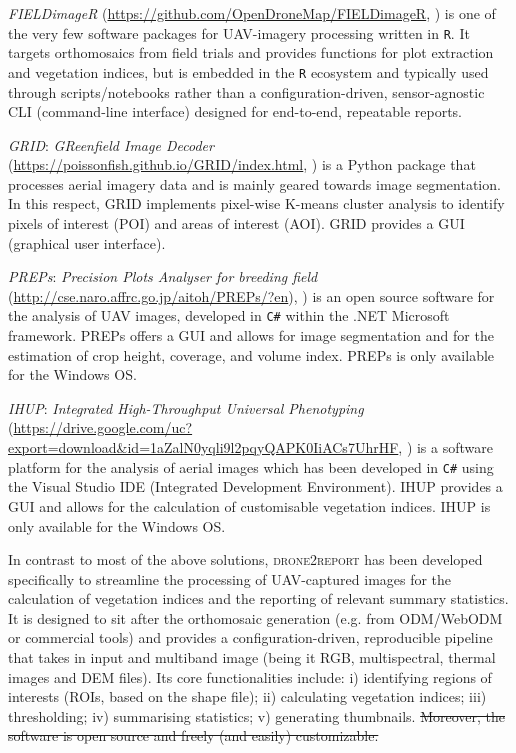 \documentclass[drones,technicalnote,accept,pdftex,moreauthors]{Definitions/mdpi}
\providecommand{\DIFdel}[1]{{\protect\color{red}\sout{#1}}}                      %
\providecommand{\DIFdelbegin}{} %
\providecommand{\DIFdelend}{} %
\newcommand{\DIFscaledelfig}{0.5}
\newlength{\DIFdelgraphicswidth} %
\newlength{\DIFdelgraphicsheight} %
\newcommand{\DIFdelincludegraphics}[2][]{%
\sbox{\DIFdelgraphicsbox}{\DIFOincludegraphics[#1]{#2}}%
\settoboxwidth{\DIFdelgraphicswidth}{\DIFdelgraphicsbox} %
\settoboxtotalheight{\DIFdelgraphicsheight}{\DIFdelgraphicsbox} %
\scalebox{\DIFscaledelfig}{%
\parbox[b]{\DIFdelgraphicswidth}{\usebox{\DIFdelgraphicsbox}\\[-\baselineskip] \rule{\DIFdelgraphicswidth}{0em}}\llap{\resizebox{\DIFdelgraphicswidth}{\DIFdelgraphicsheight}{%
\setlength{\unitlength}{\DIFdelgraphicswidth}%
\begin{picture}(1,1)%
\thicklines\linethickness{2pt} %
{\color[rgb]{1,0,0}\put(0,0){\framebox(1,1){}}}%
{\color[rgb]{1,0,0}\put(0,0){\line( 1,1){1}}}%
{\color[rgb]{1,0,0}\put(0,1){\line(1,-1){1}}}%
\end{picture}%
}\hspace*{3pt}}} %
} %
\DeclareRobustCommand{\DIFdelbegin}{\DIFOdelbegin \let\includegraphics\DIFdelincludegraphics} %
\DeclareRobustCommand{\DIFdelend}{\DIFOaddend \let\includegraphics\DIFOincludegraphics} %
\begin{document}
\textit{FIELDimageR} (\url{https://github.com/OpenDroneMap/FIELDimageR}, \cite{matias_fieldimager_2020}) is one of the very few software packages for UAV-imagery processing written in \texttt{R}. It targets orthomosaics from field trials and provides functions for plot extraction and vegetation indices, but is embedded in the \texttt{R} ecosystem and typically used through scripts/notebooks rather than a configuration-driven, sensor-agnostic CLI (command-line interface) designed for end-to-end, repeatable reports.

\textit{GRID}: \textit{GReenfield Image Decoder} (\url{https://poissonfish.github.io/GRID/index.html},
\cite{ChenZhang2020}) is a Python package that processes aerial imagery data and is mainly geared towards image segmentation. In this respect, GRID implements pixel-wise K-means cluster analysis to identify pixels of interest (POI) and areas of interest (AOI). GRID provides a GUI (graphical user interface).

\textit{PREPs}: \textit{Precision Plots Analyser for breeding field} (\url{http://cse.naro.affrc.go.jp/aitoh/PREPs/?en}), \cite{itoh2024preps}) is an open source software for the analysis of UAV images, developed in \verb|C#| within the .NET Microsoft framework. PREPs offers a GUI and allows for image segmentation and for the estimation of crop height, coverage, and volume index. PREPs is only available for the Windows OS.

\textit{IHUP}: \textit{Integrated High-Throughput Universal Phenotyping} (\url{https://drive.google.com/uc?export=download&id=1aZalN0yqli9l2pqyQAPK0IiACs7UhrHF}, \cite{wang2024ihup}) is a software platform for the analysis of aerial images which has been developed in \verb|C#| using the Visual Studio IDE (Integrated Development Environment). IHUP provides a GUI and allows for the calculation of customisable vegetation indices. IHUP is only available for the Windows OS.

\bigskip

In contrast to most of the above solutions, \textsc{drone2report} has been developed specifically to streamline the processing of UAV-captured images for the calculation of vegetation indices and the reporting of relevant summary statistics.
It is designed to sit after the orthomosaic generation (e.g. from ODM/WebODM or commercial tools) and provides a configuration-driven, reproducible pipeline that takes in input and multiband image (being it RGB, multispectral, thermal images and DEM files).  Its core functionalities include: i) identifying regions of interests (ROIs, based on the shape file); ii) calculating vegetation indices; iii) thresholding; iv) summarising statistics; v) generating thumbnails.
\DIFdelbegin \DIFdel{Moreover, the software is open source and freely (and easily) customizable.
}\DIFdelend %
\end{document}
